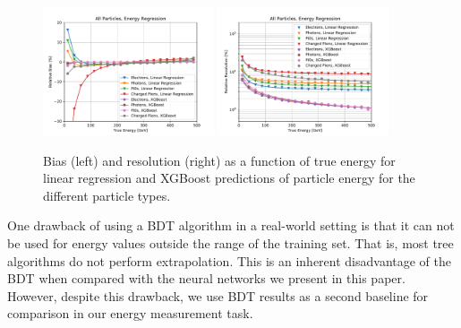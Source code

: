 \begin{figure}[htbp]
\centering
\includegraphics[width=0.45\textwidth]{Images/Calo/bias_vs_E_allparts_linreg_xgb.pdf}
\includegraphics[width=0.45\textwidth]{Images/Calo/res_vs_E_allparts_linreg_xgb_fits.pdf}
\caption{Bias (left) and resolution (right) as a function of true energy for linear regression and XGBoost  predictions of particle energy for the different particle types.\label{fig:reg_xgb_linreg}}
\end{figure}

One drawback of using a BDT algorithm in a real-world setting is that it can not be used for energy values outside the range of the training set. That is, most tree algorithms do not perform extrapolation. This is an inherent disadvantage of the BDT when compared with the neural networks we present in this paper. However, despite this drawback, we use BDT results as a second baseline for comparison in our energy measurement task.